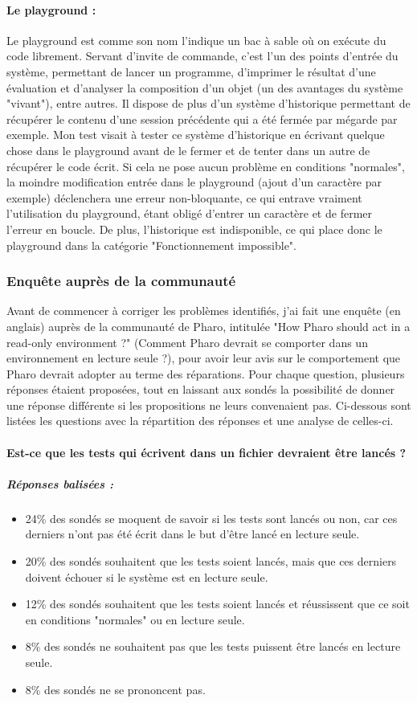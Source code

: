\paragraph{Le playground :}
Le playground est comme son nom l'indique un bac à sable où on exécute du code librement. Servant d'invite de commande, c'est l'un des points d'entrée du système, permettant de lancer un programme, d'imprimer le résultat d'une évaluation et d'analyser la composition d'un objet (un des avantages du système "vivant"), entre autres. Il dispose de plus d'un système d'historique permettant de récupérer le contenu d'une session précédente qui a été fermée par mégarde par exemple.
Mon test visait à tester ce système d'historique en écrivant quelque chose dans le playground avant de le fermer et de tenter dans un autre de récupérer le code écrit. Si cela ne pose aucun problème en conditions "normales", la moindre modification entrée dans le playground (ajout d'un caractère par exemple) déclenchera une erreur non-bloquante, ce qui entrave vraiment l'utilisation du playground, étant obligé d'entrer un caractère et de fermer l'erreur en boucle. De plus, l'historique est indisponible, ce qui place donc le playground dans la catégorie "Fonctionnement impossible".

\subsubsection{Enquête auprès de la communauté}
Avant de commencer à corriger les problèmes identifiés, j'ai fait une enquête (en anglais) auprès de la communauté de Pharo, intitulée "How Pharo should act in a read-only environment ?" (Comment Pharo devrait se comporter dans un environnement en lecture seule ?), pour avoir leur avis sur le comportement que Pharo devrait adopter au terme des réparations. Pour chaque question, plusieurs réponses étaient proposées, tout en laissant aux sondés la possibilité de donner une réponse différente si les propositions ne leurs convenaient pas. Ci-dessous sont listées les questions avec la répartition des réponses et une analyse de celles-ci.

\paragraph{Est-ce que les tests qui écrivent dans un fichier devraient être lancés ?}
\subparagraph{Réponses balisées :}
\begin{itemize}
	\item 24\% des sondés se moquent de savoir si les tests sont lancés ou non, car ces derniers n'ont pas été écrit dans le but d'être lancé en lecture seule.
	\item 20\% des sondés souhaitent que les tests soient lancés, mais que ces derniers doivent échouer si le système est en lecture seule.
	\item 12\% des sondés souhaitent que les tests soient lancés et réussissent que ce soit en conditions "normales" ou en lecture seule.
	\item 8\% des sondés ne souhaitent pas que les tests puissent être lancés en lecture seule.
	\item 8\% des sondés ne se prononcent pas.
\end{itemize}

